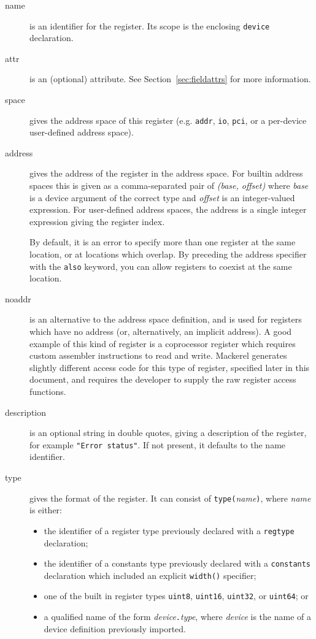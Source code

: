 \documentclass[a4paper,11pt,twoside]{report}
\begin{document}
\begin{description}

\item[name] is an identifier for the register.  Its scope is the
  enclosing \texttt{device} declaration. 

\item[attr] is an (optional) attribute.  See
  Section~\ref{sec:fieldattrs} for more information.

\item[space] gives the address space of this register
  (e.g. \texttt{addr}, \texttt{io}, \texttt{pci}, or a per-device
  user-defined address space).

\item[address] gives the address of the register in the address
  space.  For builtin address spaces this is given as a
  comma-separated pair of \textit{(base, offset)} where \textit{base}
  is a device argument of the correct type and \textit{offset} is an
  integer-valued \Mac expression.   For user-defined address spaces,
  the address is a single \Mac integer expression giving the register
  index.  

  By default, it is an error to specify more than one
  register at the same location, or at locations which overlap.  By
  preceding the address specifier with the \texttt{also} keyword, you
  can allow registers to coexist at the same location. 

\item[noaddr] is an alternative to the address space definition, and
  is used for registers which have no address (or, alternatively, an
  implicit address).  A good example of this kind of register is a
  coprocessor register which requires custom assembler instructions to
  read and write.  Mackerel generates slightly different access code
  for this type of register, specified later in this document, and
  requires the developer to supply the raw register access functions. 

\item[description] is an optional string in double quotes, giving a
  description of the register, for example \texttt{"Error status"}. 
  If not present, it defaults to the name identifier.  

\item[type] gives the format of the register.  It can consist of
  \texttt{type(}\textit{name}\texttt{)}, where \textit{name} is
  either:
  \begin{itemize}
  \item the identifier of a register type previously declared with a
    \texttt{regtype} declaration;
  \item the identifier of a constants type previously declared with a
    \texttt{constants} declaration which included an explicit
    \texttt{width()} specifier;
  \item one of the built in register types \texttt{uint8},
    \texttt{uint16}, \texttt{uint32}, or \texttt{uint64}; or
  \item a qualified name of the form
    \textit{device}\texttt{.}\textit{type}, where \textit{device}
    is the name of a device definition previously imported.  
  \end{itemize}


\end{description}
\end{document}
